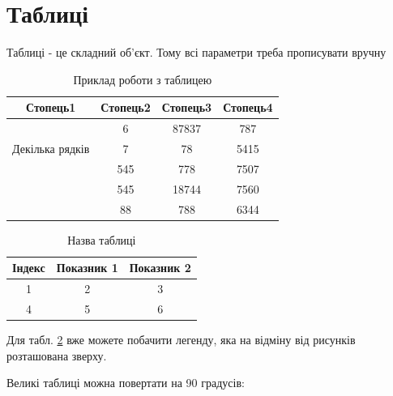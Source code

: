 \section{Таблиці}
Таблиці  - це складний об'єкт. Тому всі параметри треба прописувати вручну

\begin{table}[h!]
\centering
\begin{tabular}{|c|c|c|c|} 
 \hline
 Стопець1 & Стопець2 & Стопець3 & Стопець4 \\ [0.5ex] 
 \hline
 \multirow{3}{5em}{Декілька рядків} & 6 & 87837 & 787 \\ 
  &  7 & 78 & 5415 \\
   & 545 & 778 & 7507 \\
   & 545 & 18744 & 7560 \\
   & 88 & 788 & 6344 \\ [1ex] 
 \hline
\end{tabular}
\caption{Приклад роботи з таблицею}
\label{table:1}
\end{table}


\begin{table}[h]
\caption{\label{table:label}Назва таблиці}
\hspace{\floatindent}   %
\begin{tabular}{|c|c|c|}
\hline 
Індекс & Показник 1 & Показник 2 \\
\hline\hline 
1 & 2 & 3 \\
\hline 
4 & 5 & 6 \\
\hline 
\end{tabular}
\end{table}

Для табл. \ref{table:label} вже можете побачити легенду, яка на відміну від рисунків розташована зверху.

Великі таблиці можна повертати на 90 градусів:


